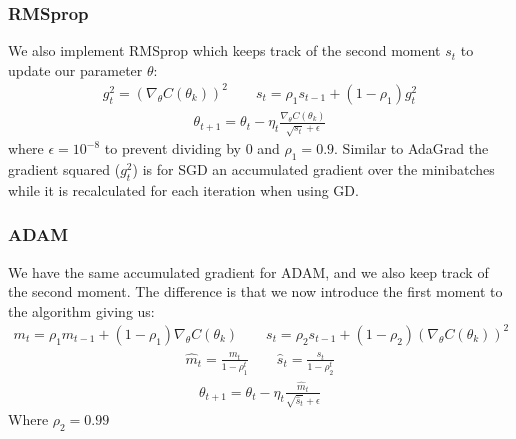 \documentclass[11pt]{article}
\begin{document}
\subsubsection*{RMSprop}
We also implement RMSprop which keeps track of the second moment $s_t$ to update our parameter $\theta$:
\begin{align*}
    g_t^2 = (\nabla_\theta C(\theta_k))^2  \quad\quad s_t = \rho_1 s_{t-1} + (1- \rho_1)g_t^2
\end{align*}
\begin{align*}
    \theta_{t+1} = \theta_t - \eta_t \frac{\nabla_\theta C(\theta_k)}{\sqrt{s_t} + \epsilon }
\end{align*}
where $\epsilon=10^{-8}$ to prevent dividing by 0 and $\rho_1 = 0.9$. Similar to AdaGrad the gradient squared ($g_t^2$) is for SGD an accumulated gradient over the minibatches while it is recalculated for each iteration when using GD.
\subsubsection*{ADAM}
We have the same accumulated gradient for ADAM, and we also keep track of the second moment. The difference is that we now introduce the first moment to the algorithm giving us:
\begin{align*}
    m_t = \rho_1 m_{t-1} + (1-\rho_1)\nabla_\theta C(\theta_k) \quad\quad s_t = \rho_2 s_{t-1} + (1- \rho_2)(\nabla_\theta C(\theta_k))^2
\end{align*}
\begin{align*}
    \hat{m}_t = \frac{m_t }{1-\rho_1^t} \quad\quad \hat{s}_t = \frac{s_t }{1- \rho_2^t}
\end{align*}
\begin{align*}
    \theta_{t+1} = \theta_t - \eta_t \frac{\hat{m}_t}{\sqrt{\hat{s}_t} + \epsilon }
\end{align*}
Where $\rho_2=0.99$
\end{document}
